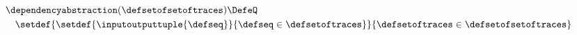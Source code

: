 \begin{align*}
    &\dependencyabstraction(\defsetofsetoftraces) \DefeQ \\
    &\quad \setdef{
      \setdef{\inputoutputtuple{\defseq}}{\defseq\in\defsetoftraces}
    }{
      \defsetoftraces\in\defsetofsetoftraces
    }
  \end{align*}
